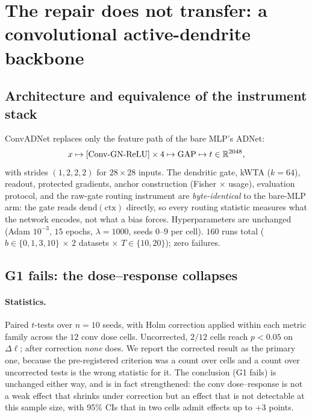 \documentclass[review,12pt,number]{elsarticle}
\begin{document}





\section{The repair does not transfer: a convolutional active-dendrite backbone}
\label{sec:conv}

\subsection{Architecture and equivalence of the instrument stack}

ConvADNet replaces only the feature path of the bare MLP's ADNet:
\[
x \mapsto [\mathrm{Conv}{\text -}\mathrm{GN}{\text -}\mathrm{ReLU}]
\times 4 \mapsto \mathrm{GAP} \mapsto t \in \mathbb{R}^{2048},
\]
with strides $(1,2,2,2)$ for $28{\times}28$ inputs. The dendritic
gate, kWTA ($k{=}64$), readout, protected gradients, anchor
construction (Fisher $\times$ usage), evaluation protocol, and the
raw-gate routing instrument are \emph{byte-identical} to the bare-MLP arm: the gate
reads $\mathrm{dend}(\mathrm{ctx})$ directly, so every routing
statistic measures what the network encodes, not what a bias forces.
Hyperparameters are unchanged (Adam $10^{-3}$, $15$ epochs,
$\lambda{=}1000$, seeds $0$--$9$ per cell). $160$ runs total
($b \in \{0,1,3,10\}$ $\times$ $2$ datasets $\times$ $T \in
\{10,20\}$); zero failures.

\subsection{G1 fails: the dose--response collapses}
\label{sec:convstat}

\paragraph{Statistics.} Paired $t$-tests over $n=10$ seeds, with Holm correction applied within each metric family across the $12$ conv dose cells. Uncorrected, $2/12$ cells reach $p<0.05$ on $\Delta\ell$; after correction \emph{none} does. We report the corrected result as the primary one, because the pre-registered criterion was a count over cells and a count over uncorrected tests is the wrong statistic for it. The conclusion (G1 fails) is unchanged either way, and is in fact strengthened: the conv dose--response is not a weak effect that shrinks under correction but an effect that is not detectable at this sample size, with 95\% CIs that in two
cells admit effects up to $+3$ points.
\end{document}
